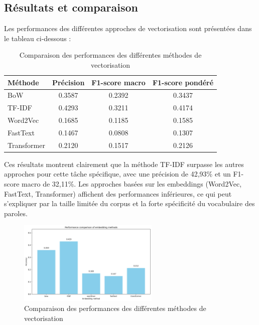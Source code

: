 \documentclass[a4paper,11pt]{article}
\begin{document}
\subsection{Résultats et comparaison}
Les performances des différentes approches de vectorisation sont présentées dans le tableau ci-dessous :

\begin{table}[h]
\centering
\begin{tabular}{lccc}
\toprule
\textbf{Méthode} & \textbf{Précision} & \textbf{F1-score macro} & \textbf{F1-score pondéré} \\
\midrule
BoW & 0.3587 & 0.2392 & 0.3437 \\
TF-IDF & 0.4293 & 0.3211 & 0.4174 \\
Word2Vec & 0.1685 & 0.1185 & 0.1585 \\
FastText & 0.1467 & 0.0808 & 0.1307 \\
Transformer & 0.2120 & 0.1517 & 0.2126 \\
\bottomrule
\end{tabular}
\caption{Comparaison des performances des différentes méthodes de vectorisation}
\label{tab:classification-results}
\end{table}

Ces résultats montrent clairement que la méthode TF-IDF surpasse les autres approches pour cette tâche spécifique, avec une précision de 42,93\% et un F1-score macro de 32,11\%. Les approches basées sur les embeddings (Word2Vec, FastText, Transformer) affichent des performances inférieures, ce qui peut s'expliquer par la taille limitée du corpus et la forte spécificité du vocabulaire des paroles.

\begin{figure}[ht]
    \centering
    \includegraphics[width=0.6\textwidth]{results_rapport/embedding_accuracy_comparison.png}
    \caption{Comparaison des performances des différentes méthodes de vectorisation}
    \label{fig:embedding-comparison}
\end{figure}
\end{document}
